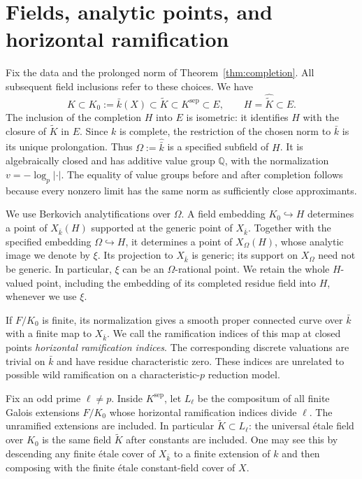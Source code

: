 \section{Fields, analytic points, and horizontal ramification}
\label{sec:preliminaries}

Fix the data and the prolonged norm of Theorem~\ref{thm:completion}.
All subsequent field inclusions refer to these choices. We have
\[
 K\subset K_0:=\bar k(X)\subset\widetilde K\subset K^{\mathrm{sep}}
 \subset E,
 \qquad H=\widehat{\widetilde K}\subset E.
\]
The inclusion of the completion $H$ into $E$ is isometric: it identifies
$H$ with the closure of $\widetilde K$ in $E$. Since $k$ is complete, the
restriction of the chosen norm to $\bar k$ is its unique prolongation.
Thus $\Omega:=\widehat{\bar k}$ is a specified subfield of $H$.
It is algebraically closed and has additive value group $\mathbb Q$,
with the normalization $v=-\log_p|\cdot|$. The equality of value groups
before and after completion follows because every nonzero limit has
the same norm as sufficiently close approximants.

We use Berkovich analytifications over $\Omega$. A field embedding
$K_0\hookrightarrow H$ determines a point of $X_{\bar k}(H)$ supported
at the generic point of $X_{\bar k}$. Together with the specified
embedding $\Omega\hookrightarrow H$, it determines a point of
$X_\Omega(H)$, whose analytic image we denote by $\xi$. Its projection
to $X_{\bar k}$ is generic; its support on $X_\Omega$ need not be
generic. In particular, $\xi$ can be an $\Omega$-rational point.
We retain the whole $H$-valued point, including the embedding of its
completed residue field into $H$, whenever we use $\xi$.

If $F/K_0$ is finite, its normalization gives a smooth proper connected
curve over $\bar k$ with a finite map to $X_{\bar k}$. We call the
ramification indices of this map at closed points \emph{horizontal
ramification indices}. The corresponding discrete valuations are trivial
on $\bar k$ and have residue characteristic zero. These indices are
unrelated to possible wild ramification on a characteristic-$p$
reduction model.

Fix an odd prime $\ell\ne p$. Inside $K^{\mathrm{sep}}$, let $L_\ell$
be the compositum of all finite Galois extensions $F/K_0$ whose horizontal
ramification indices divide $\ell$. The unramified extensions are
included. In particular $\widetilde K\subset L_\ell$: the universal
\'etale field over $K_0$ is the same field $\widetilde K$ after constants
are included. One may see this by descending any finite \'etale cover of
$X_{\bar k}$ to a finite extension of $k$ and then composing with the
finite \'etale constant-field cover of $X$.

